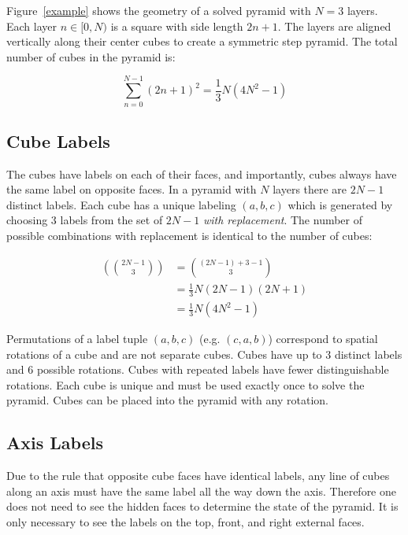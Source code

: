 \documentclass[conference]{IEEEtran}
\begin{document}
Figure~\ref{example} shows the geometry of a solved pyramid with $N=3$ layers.
Each layer $n\in[0,N)$ is a square with side length $2n+1$.
The layers are aligned vertically along their center cubes to create a symmetric step pyramid. The total number of cubes in the pyramid is:

\begin{equation}
\sum_{n=0}^{N-1}(2n+1)^2 = \frac{1}{3}N(4N^2-1)
\end{equation}

\subsection{Cube Labels}

The cubes have labels on each of their faces, and importantly, cubes always have the same label on opposite faces.
In a pyramid with $N$ layers there are $2N-1$ distinct labels.
Each cube has a unique labeling $(a,b,c)$ which is generated by choosing 3 labels from the set of $2N-1$ \emph{with replacement}.
The number of possible combinations with replacement is identical to the number of cubes:

\begin{equation}
\begin{aligned}
\left(\binom{2N-1}{3}\right) &= \binom{(2N-1)+3-1}{3} \\
&= \frac{1}{3}N(2N-1)(2N+1) \\
&= \frac{1}{3}N(4N^2-1)
\end{aligned}
\end{equation}

Permutations of a label tuple $(a,b,c)$ (e.g. $(c,a,b)$) correspond to spatial rotations of a cube and are not separate cubes.
Cubes have up to 3 distinct labels and 6 possible rotations.
Cubes with repeated labels have fewer distinguishable rotations.
Each cube is unique and must be used exactly once to solve the pyramid.
Cubes can be placed into the pyramid with any rotation.

\subsection{Axis Labels}

Due to the rule that opposite cube faces have identical labels, any line of cubes along an axis must have the same label all the way down the axis.
Therefore one does not need to see the hidden faces to determine the state of the pyramid.
It is only necessary to see the labels on the top, front, and right external faces.
\end{document}
